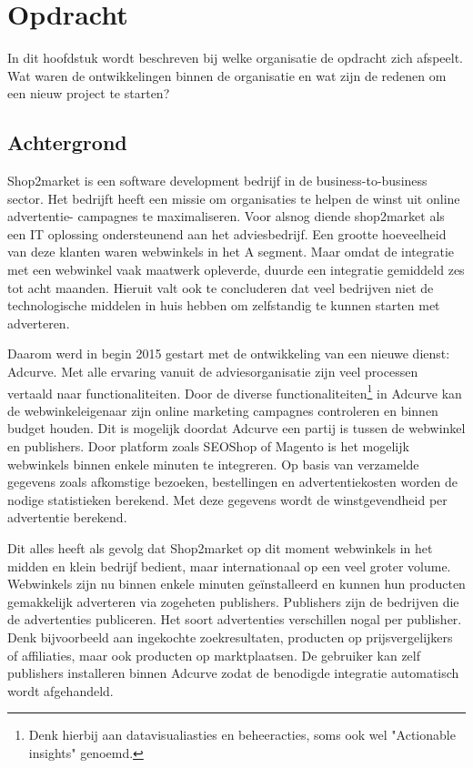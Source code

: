 
\chapter{Opdracht}

In dit hoofdstuk wordt beschreven bij welke organisatie de opdracht zich afspeelt. Wat waren de ontwikkelingen binnen de organisatie en wat zijn de redenen om een nieuw project te starten?

\section{Achtergrond}

Shop2market is een software development bedrijf in de business-to-business sector. Het bedrijft heeft een missie om organisaties te helpen de winst uit online advertentie- campagnes te maximaliseren. 
Voor alsnog diende shop2market als een IT oplossing ondersteunend aan het adviesbedrijf. Een grootte hoeveelheid van deze klanten waren webwinkels in het A segment. Maar omdat de integratie met een webwinkel vaak maatwerk opleverde, duurde een integratie gemiddeld zes tot acht maanden. Hieruit valt ook te concluderen dat veel bedrijven niet de technologische middelen in huis hebben om zelfstandig te kunnen starten met adverteren.

Daarom werd in begin 2015 gestart met de ontwikkeling van een nieuwe dienst: Adcurve. Met alle ervaring vanuit de adviesorganisatie zijn veel processen vertaald naar functionaliteiten. Door de diverse functionaliteiten\footnote{ Denk hierbij aan datavisualiasties en beheeracties, soms ook wel "Actionable insights" genoemd.} in Adcurve kan de webwinkeleigenaar zijn online marketing campagnes controleren en binnen budget houden. Dit is mogelijk doordat Adcurve een partij is tussen de webwinkel en publishers. Door platform zoals SEOShop of Magento is het mogelijk webwinkels binnen enkele minuten te integreren. 
Op basis van verzamelde gegevens zoals afkomstige bezoeken, bestellingen en advertentiekosten worden de nodige statistieken berekend. Met deze gegevens wordt de winstgevendheid per advertentie berekend.


Dit alles heeft als gevolg dat Shop2market op dit moment webwinkels in het midden en klein bedrijf  bedient, maar internationaal op een veel groter volume. Webwinkels zijn nu binnen enkele minuten geïnstalleerd en kunnen hun producten gemakkelijk adverteren via zogeheten publishers. Publishers zijn de bedrijven die de advertenties publiceren. Het soort advertenties verschillen nogal per publisher. Denk bijvoorbeeld aan ingekochte zoekresultaten, producten op prijsvergelijkers of affiliaties, maar ook producten op marktplaatsen. De gebruiker kan zelf publishers installeren binnen Adcurve zodat de benodigde integratie automatisch wordt afgehandeld. 


